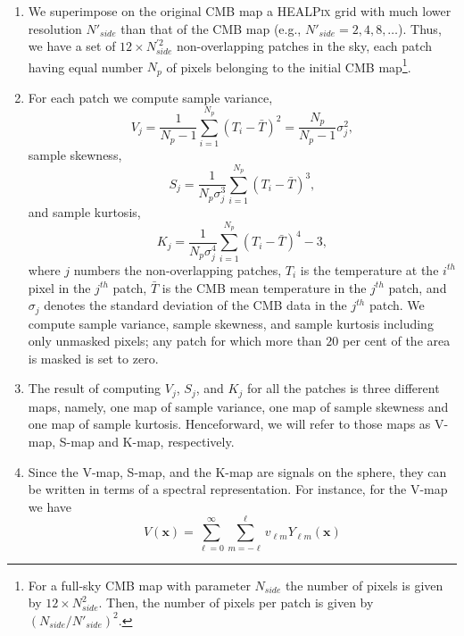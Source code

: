 \begin{enumerate}
\item We superimpose on the original CMB map a \textsc{HEALPix} grid with much lower resolution $N'_{side}$ than that of the CMB map (e.g., $N'_{side} = 2,4,8,\dots$). Thus, we have a set of $12 \times N^{'2}_{side}$ non-overlapping patches in the sky, each patch having equal number $N_p$ of pixels belonging to the initial CMB map\footnote{For a full-sky CMB map with parameter $N_{side}$ the number of pixels is given by $12 \times N^2_{side}$. Then, the number of pixels per patch is given by $\left(N_{side}/N'_{side}\right)^2$.}. %
\item For each patch we compute sample variance,
\begin{equation}
\label{eq:1}
V_j = \frac{1}{N_p -1} \sum_{i=1}^{N_p} (T_i - \bar{T})^2 = \frac{N_p}{N_p -1} \sigma_j^2 ,
\end{equation}
sample skewness,
\begin{equation}
\label{eq:2}
S_j = \frac{1}{N_p \sigma_j^3} \sum_{i=1}^{N_p} (T_i - \bar{T})^3 ,
\end{equation}
and sample kurtosis,
\begin{equation}
\label{eq:3}
K_j = \frac{1}{N_p \sigma_j^4} \sum_{i=1}^{N_p} (T_i - \bar{T})^4 - 3 ,
\end{equation}
where $j$ numbers the non-overlapping patches, $T_i$ is the temperature at the $i^{th}$ pixel in the $j^{th}$ patch, $\bar{T}$ is the CMB mean temperature in the $j^{th}$ patch, and $\sigma_j$ denotes the standard deviation of the CMB data in the $j^{th}$ patch. We compute sample variance, sample skewness, and sample kurtosis including only unmasked pixels; any patch for which more than $20$ per cent of the area is masked is set to zero.
\item The result of computing $V_j$, $S_j$, and $K_j$ for all the patches is three different maps, namely, one map of sample variance, one map of sample skewness and one map of sample kurtosis. Henceforward, we will refer to those maps as V-map, S-map and K-map, respectively.
\item Since the V-map, S-map, and the K-map are signals on the sphere, they can be written in terms of a spectral representation. For instance, for the V-map we have 
\begin{equation}
\label{eq:4}
V(\mathbf{x}) = \sum^{\infty}_{\ell=0} \sum^{\ell}_{m=-\ell} v_{\ell m} Y_{\ell m} (\mathbf{x})
\end{equation}


\end{enumerate}
